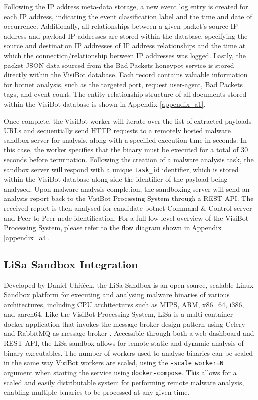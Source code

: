 Following the IP address meta-data storage, a new event log entry is created for each IP address, indicating the event classification label and the time and date of occurrence. Additionally, all relationships between a given packet's source IP address and payload IP addresses are stored within the database, specifying the source and destination IP addresses of IP address relationships and the time at which the connection/relationship between IP addresses was logged. Lastly, the packet JSON data sourced from the Bad Packets honeypot service is stored directly within the VisiBot database. Each record contains valuable information for botnet analysis, such as the targeted port, request user-agent, Bad Packets tags, and event count. The entity-relationship structure of all documents stored within the VisiBot database is shown in Appendix \ref{appendix_a1}.

Once complete, the VisiBot worker will iterate over the list of extracted payloads URLs and sequentially send HTTP requests to a remotely hosted malware sandbox server for analysis, along with a specified execution time in seconds. In this case, the worker specifies that the binary must be executed for a total of 30 seconds before termination. Following the creation of a malware analysis task, the sandbox server will respond with a unique \texttt{task\_id} identifier, which is stored within the VisiBot database along-side the identifier of the payload being analysed. Upon malware analysis completion, the sandboxing server will send an analysis report back to the VisiBot Processing System through a REST API. The received report is then analysed for candidate botnet Command \& Control server and Peer-to-Peer node identification. For a full low-level overview of the VisiBot Processing System, please refer to the flow diagram shown in Appendix \ref{appendix_a4}.

\subsection{LiSa Sandbox Integration}

Developed by Daniel Uhříček, the LiSa Sandbox \citep{LiSa} is an open-source, scalable Linux Sandbox platform for executing and analysing malware binaries of various architectures, including CPU architectures such as MIPS, ARM, x86\_64, i386, and aarch64. Like the VisiBot Processing System, LiSa is a multi-container docker application that invokes the message-broker design pattern using Celery and RabbitMQ as message broker \citep{Celery, RabbitMQ}.
Accessible through both a web dashboard and REST API, the LiSa sandbox allows for remote static and dynamic analysis of binary executables. The number of workers used to analyse binaries can be scaled in the same way VisiBot workers are scaled, using the \texttt{-scale worker=N} argument when starting the service using \texttt{docker-compose}. This allows for a scaled and easily distributable system for performing remote malware analysis, enabling multiple binaries to be processed at any given time. 

